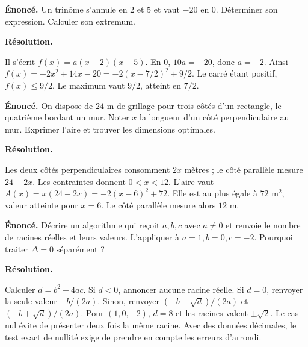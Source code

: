 \documentclass[11pt,a4paper]{article}
\begin{document}
\par\noindent\begin{minipage}{\linewidth}
{\small\color{Muted}\textbf{Énoncé.} Un trinôme s’annule en $2$ et $5$ et vaut $-20$ en $0$. Déterminer son expression. Calculer son extremum.}
\par\medskip
\textbf{Résolution.}\par
Il s’écrit $f(x)=a(x-2)(x-5)$. En $0$, $10a=-20$, donc $a=-2$. Ainsi $f(x)=-2x^2+14x-20=-2(x-7/2)^2+9/2$. Le carré étant positif, $f(x)\le9/2$. Le maximum vaut $9/2$, atteint en $7/2$.
\end{minipage}\par
\par\noindent\begin{minipage}{\linewidth}
{\small\color{Muted}\textbf{Énoncé.} On dispose de $24$ m de grillage pour trois côtés d’un rectangle, le quatrième bordant un mur. Noter $x$ la longueur d’un côté perpendiculaire au mur. Exprimer l’aire et trouver les dimensions optimales.}
\par\medskip
\textbf{Résolution.}\par
Les deux côtés perpendiculaires consomment $2x$ mètres ; le côté parallèle mesure $24-2x$. Les contraintes donnent $0<x<12$. L’aire vaut $A(x)=x(24-2x)=-2(x-6)^2+72$. Elle est au plus égale à $72$ m$^2$, valeur atteinte pour $x=6$. Le côté parallèle mesure alors $12$ m.
\end{minipage}\par
\par\noindent\begin{minipage}{\linewidth}
{\small\color{Muted}\textbf{Énoncé.} Décrire un algorithme qui reçoit $a,b,c$ avec $a\ne0$ et renvoie le nombre de racines réelles et leurs valeurs. L’appliquer à $a=1,b=0,c=-2$. Pourquoi traiter $\Delta=0$ séparément ?}
\par\medskip
\textbf{Résolution.}\par
Calculer $d=b^2-4ac$. Si $d<0$, annoncer aucune racine réelle. Si $d=0$, renvoyer la seule valeur $-b/(2a)$. Sinon, renvoyer $(-b-\sqrt d)/(2a)$ et $(-b+\sqrt d)/(2a)$. Pour $(1,0,-2)$, $d=8$ et les racines valent $\pm\sqrt2$. Le cas nul évite de présenter deux fois la même racine. Avec des données décimales, le test exact de nullité exige de prendre en compte les erreurs d’arrondi.
\end{minipage}\par
\end{document}
